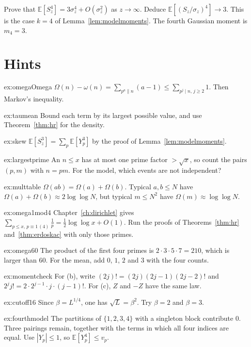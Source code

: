 \begin{exercise}[$\star\star\star$]\label{ex:fourthmodel}
Prove that $\mathbb E[S_z^4]=3\sigma_z^4+O(\sigma_z^2)$ as $z\to\infty$. Deduce $\mathbb E[(S_z/\sigma_z)^4]\to 3$. This is the case $k=4$ of Lemma~\ref{lem:modelmoments}. The fourth Gaussian moment is $m_4=3$.
\end{exercise}

\section{Hints}

\begin{hint}{ex:omegaOmega}
$\Omega(n)-\omega(n)=\sum_{p^a\|n}(a-1)\le\sum_{p^j\mid n,\,j\ge2}1$. Then Markov's inequality.
\end{hint}
\begin{hint}{ex:taumean}
Bound each term by its largest possible value, and use Theorem~\ref{thm:hr} for the density.
\end{hint}
\begin{hint}{ex:skew}
$\mathbb E[S_z^3]=\sum_p\mathbb E[Y_p^3]$ by the proof of Lemma~\ref{lem:modelmoments}.
\end{hint}
\begin{hint}{ex:largestprime}
An $n\le x$ has at most one prime factor $>\sqrt x$, so count the pairs $(p,m)$ with $n=pm$. For the model, which events are not independent?
\end{hint}
\begin{hint}{ex:multtable}
$\Omega(ab)=\Omega(a)+\Omega(b)$. Typical $a,b\le N$ have $\Omega(a)+\Omega(b)\approx2\log\log N$, but typical $m\le N^2$ have $\Omega(m)\approx\log\log N$.
\end{hint}
\begin{hint}{ex:omega1mod4}
Chapter~\ref{ch:dirichlet} gives $\sum_{p\le x,\,p\equiv1\,(4)}\frac1p=\frac12\log\log x+O(1)$. Run the proofs of Theorems~\ref{thm:hr} and~\ref{thm:erdoskac} with only those primes.
\end{hint}
\begin{hint}{ex:omega60}
The product of the first four primes is $2\cdot3\cdot5\cdot7=210$, which is larger than $60$. For the mean, add $0$, $1$, $2$ and $3$ with the four counts.
\end{hint}
\begin{hint}{ex:momentcheck}
For (b), write $(2j)!=(2j)(2j-1)(2j-2)!$ and $2^j j!=2\cdot 2^{j-1}\cdot j\cdot(j-1)!$. For (c), $Z$ and $-Z$ have the same law.
\end{hint}
\begin{hint}{ex:cutoff16}
Since $\beta=L^{1/4}$, one has $\sqrt L=\beta^2$. Try $\beta=2$ and $\beta=3$.
\end{hint}
\begin{hint}{ex:fourthmodel}
The partitions of $\{1,2,3,4\}$ with a singleton block contribute $0$. Three pairings remain, together with the terms in which all four indices are equal. Use $|Y_p|\le1$, so $\mathbb E[Y_p^4]\le v_p$.
\end{hint}

